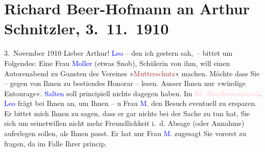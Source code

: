 

               \section[Richard Beer-Hofmann an Arthur Schnitzler, 3. 11. 1910]{ Richard Beer-Hofmann an Arthur Schnitzler, 3. 11. 1910}\nopagebreak{}\rehead{ }\normalsize\beginnumbering{} \toendnotes[C]{\smallbreak\pagebreak[2]} 
\pstart
           \raggedleft{}{\pb}3. November 1910\pend
           \pstart
           Lieber Arthur! \textcolor{blue}{Leo}{}\ledrightnote{\textcolor{blue}{Leo Van-Jung}} – den ich gestern sah, – bittet um Folgendes:
               Eine Frau \textcolor{blue}{Moller}{}\ledrightnote{\textcolor{blue}{Alice Moller}} (etwas Snob), Schülerin von ihm,
               will einen Autorenabend zu Gunsten des Vereines »\textcolor{brown}{Mutterschutz}{}\ledrightnote{\textcolor{brown}{Bund für Mutterschutz}}« machen. Möchte dass Sie – gegen von Ihnen zu besti{\geminationm}endes Honorar – lesen. Ausser Ihnen nur »würdige
               Entourage«. \textcolor{blue}{Salten}{}\ledrightnote{\textcolor{blue}{Felix Salten}} soll principiell nichts dagegen
               haben. Im \textcolor{pink}{Kl. Musikvereinssaal}{}\ledrightnote{\textcolor{pink}{Musikverein}}. \textcolor{blue}{Leo}{}\ledrightnote{\textcolor{blue}{Leo Van-Jung}} frägt bei Ihnen an, um Ihnen – u Frau \textcolor{blue}{M.}{}\ledrightnote{\textcolor{blue}{Alice Moller}} den Besuch \introOben{}eventuell\introOben{} zu ersparen.
               Er bittet mich Ihnen zu sagen, dass er gar nichts bei der Sache zu tun hat, Sie sich
               um seinetwillen nicht mehr {\pb}Freundlichkeit i. d. Absage (oder Annahme) auferlegen sollen, als  Ihnen passt. Er hat nur Frau \textcolor{blue}{M.}{}\ledrightnote{\textcolor{blue}{Alice Moller}} zugesagt Sie vorerst zu fragen, da im Falle Ihrer princip.
